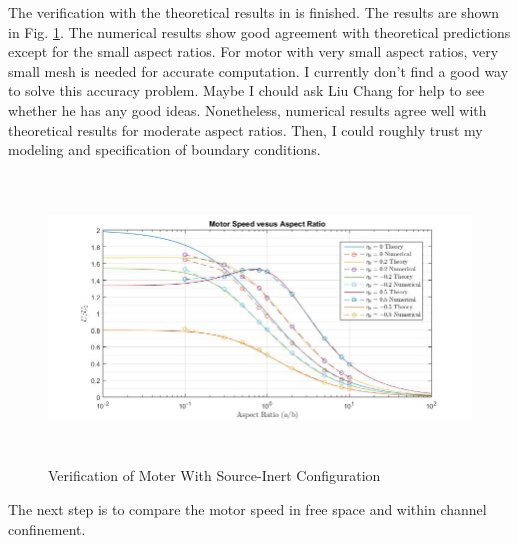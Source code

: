 \documentclass[fontsize=11pt, %
                             paper=a4, %
                             twoside, %
                             captions=tableheading,
                             index=totoc,
                             hyperref]{labbook}
\begin{document}
\begin{addmargin}[4cm]{0cm}
The verification with the theoretical results in \cite{Nourhani2016} is finished. The results are shown in Fig. \ref{VoMWSIC-10-26-2016}. The numerical results show good agreement with theoretical predictions except for the small aspect ratios. For motor with very small aspect ratios, very small mesh is needed for accurate computation. I currently don't find a good way to solve this accuracy problem. Maybe I chould ask Liu Chang for help to see whether he has any good ideas. Nonetheless, numerical results agree well with theoretical results for moderate aspect ratios. Then, I could roughly trust my modeling and specification of boundary conditions. \\
\begin{figure}
\centering
\includegraphics[width=\linewidth, height=3in]{2016-10-26-verification.jpg}
\caption{Verification of Moter With Source-Inert Configuration}\label{VoMWSIC-10-26-2016}
\end{figure}
The next step is to compare the motor speed in free space and within channel confinement.


\end{addmargin}
\end{document}
